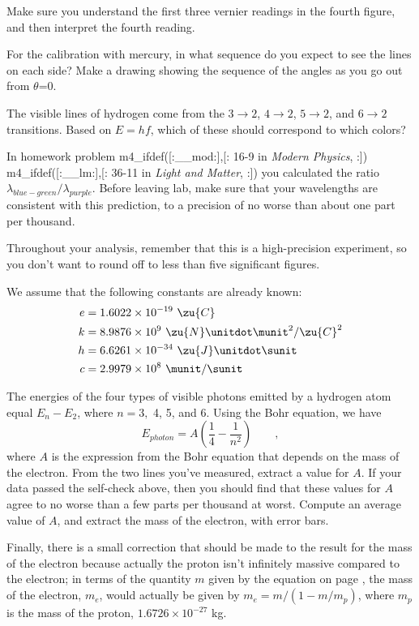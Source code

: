 
\prelabquestion  Make sure you understand the first three vernier
readings in the fourth figure, and then interpret the fourth reading.

\prelabquestion  For the calibration with mercury,
in what sequence do you expect to see the lines on
each side? Make a drawing showing the sequence of the angles
as you go out from $\theta $=0.

\prelabquestion
The visible lines of hydrogen come from the $3\rightarrow2$,
$4\rightarrow2$, $5\rightarrow2$, and $6\rightarrow2$
transitions. Based on $E=hf$, which of these should
correspond to which colors?

\selfcheck

In homework problem
m4_ifdef([:__mod:],[:%
16-9 in \emph{Modern Physics},%
:])%
m4_ifdef([:__lm:],[:%
36-11 in \emph{Light and Matter},%
:])%
you calculated the ratio\\ $\lambda_{blue-green}/\lambda_{purple}$.
Before leaving lab, make sure that your wavelengths are consistent with this prediction,
to a precision of no worse than about one part per thousand.

\analysis

Throughout your analysis, remember that this is a high-precision
experiment, so you don't want to round off to less than five
significant figures.

We assume
that the following constants are already known:
\begin{align*}
  e	&= 1.6022\times10^{-19}\ \zu{C}\\
  k	&= 8.9876\times10^9\ \zu{N}\unitdot\munit^2/\zu{C}^2 \\
  h	&= 6.6261\times10^{-34}\ \zu{J}\unitdot\sunit \\
  c     &= 2.9979\times10^8\ \munit/\sunit
\end{align*}

The energies of the four types of visible photons emitted by
a hydrogen atom equal $E_n-E_2$, where $n=3,$ 4, 5, and 6.
Using the Bohr equation, we have
\begin{equation*}
  E_{photon} = A\left(\frac{1}{4}-\frac{1}{n^2}\right) \qquad ,
\end{equation*}
where $A$ is the expression from the Bohr equation that depends
on the mass of the electron. From the two lines you've measured,
extract a value for $A$. If your data passed the self-check above, then
you should find that these values for $A$ agree
to no worse than a few parts per thousand at worst.
Compute an average value of $A$, and extract the mass of the electron,
with error bars.

Finally, there is a small correction that should be made to the result
for the mass of the electron because actually the proton isn't infinitely
massive compared to the electron; in terms of the quantity $m$ given by the
equation on page \pageref{bohr-equation}, the mass of the electron, $m_e$, would
actually be given by $m_e=m/(1-m/m_p)$, where $m_p$ is the mass of the proton,
$1.6726\times10^{-27}$ kg.
